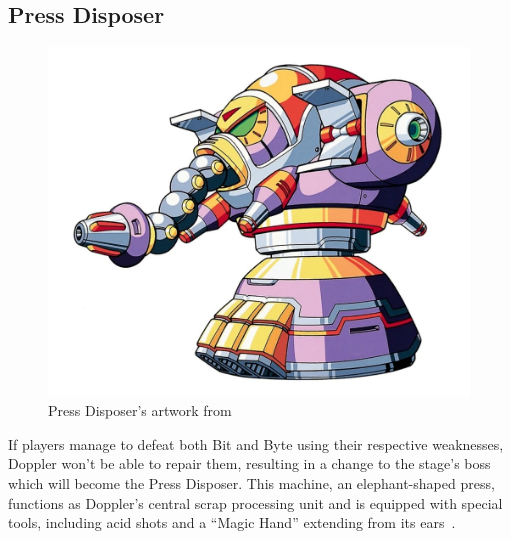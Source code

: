 \subsection{Press Disposer}\label{boss:Press_disposer}
\begin{figure}[htp]
	\centering
	\includegraphics[height=\portraitsize]{figures/X3/Doppler_stages/pressdisposer.png}
	\caption{Press Disposer's artwork from~\cite{book:MMX_Complete_art} }
\end{figure}

If players manage to defeat both Bit and Byte using their respective weaknesses, Doppler won't be able to repair them, resulting in a change to the stage's boss which will become the Press Disposer. This machine, an elephant-shaped press, functions as Doppler's central scrap processing unit and is equipped with special tools, including acid shots and a ``Magic Hand'' extending from its ears~\cite{wayback:X3_resources}.


